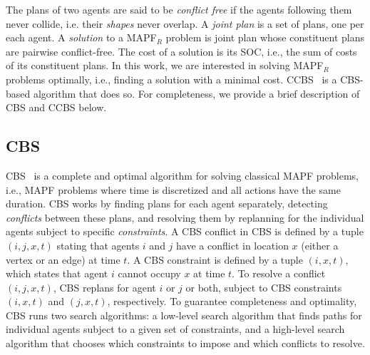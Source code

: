 \documentclass[letterpaper]{article} %
\newcommand\konstantin[1]{\nb{\textbf{Konstantin:}}{red}{#1}}
\newcommand{\cbs}{\ac{CBS}\xspace}
\newcommand{\ccbs}{\ac{CCBS}\xspace}
\newcommand{\soc}{\ac{SOC}\xspace}
\newcommand{\mapfr}{{MAPF}$_R$\xspace}
\newcommand{\mapf}{\ac{MAPF}\xspace}
\begin{document}
The plans of two agents are said to be \emph{conflict free} if the agents following them never collide, i.e. their \emph{shapes} never overlap. 
A \emph{joint plan} is a set of plans, one per each agent. 
A \emph{solution} to a \mapfr problem is joint plan whose constituent plans are pairwise conflict-free. 
The cost of a solution is its \soc, i.e., the sum of costs of its constituent plans.  
In this work, we are interested in solving \mapfr problems optimally, i.e., finding a  solution with a minimal cost. %
\ccbs~\cite{andreychuk2019multi} is a \cbs-based algorithm that does so. 
For completeness, we provide a brief description of \cbs and \ccbs below. 





\subsection{\acf{CBS}}

\cbs~\cite{sharon2015conflict} is a complete and optimal algorithm for solving classical \mapf problems, i.e., \mapf problems where time is discretized and all actions have the same duration. 
\cbs works by finding plans for each agent separately, detecting \emph{conflicts} between these plans, and resolving them by replanning for the individual agents subject to specific \emph{constraints}.
A \cbs conflict in \cbs is defined by a tuple $(i,j,x,t)$ 
stating that agents $i$ and $j$ have a conflict in location $x$ (either a vertex or an edge) at time $t$. A \cbs constraint is defined by a tuple $(i,x,t)$, which states that agent $i$ cannot occupy $x$ at time $t$. 
To resolve a conflict $(i,j,x,t)$, \cbs replans for agent $i$ or $j$ or both, subject to \cbs constraints $(i,x,t)$ and $(j,x,t)$, respectively. 
To guarantee completeness and optimality, \cbs runs two search algorithms: a low-level search algorithm that finds paths for individual agents subject to a given set of constraints, and a high-level search algorithm that chooses which constraints to impose and which conflicts to resolve. 



\end{document}
